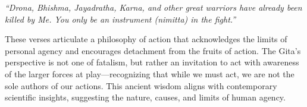 \textit{``Drona, Bhishma, Jayadratha, Karna, and other great warriors have already been killed by Me. You only be an instrument (nimitta) in the fight.''}

These verses articulate a philosophy of action that acknowledges the limits of personal agency and encourages detachment from the fruits of action. The Gita's perspective is not one of fatalism, but rather an invitation to act with awareness of the larger forces at play—recognizing that while we must act, we are not the sole authors of our actions. This ancient wisdom aligns with contemporary scientific insights, suggesting the nature, causes, and limits of human agency.
